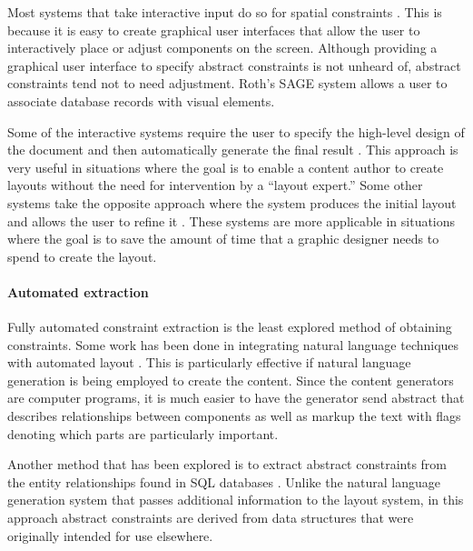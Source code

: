       Most systems that take interactive input do so for spatial constraints
      \citep{singh-2,hudson-2,borning-1}. This is because it is easy to create
      graphical user interfaces that allow the user to interactively place or
      adjust components on the screen. Although providing a graphical user
      interface to specify abstract constraints is not unheard of, abstract
      constraints tend not to need adjustment. Roth’s SAGE system \citep{roth-1}
      allows a user to associate database records with visual elements.

      Some of the interactive systems require the user to specify the high-level
      design of the document and then automatically generate the final result
      \citep{kim-1}. This approach is very useful in situations where the goal is
      to enable a content author to create layouts without the need for
      intervention by a “layout expert.” Some other systems take the opposite
      approach where the system produces the initial layout and allows the user
      to refine it \citep{singh-1}. These systems are more applicable in
      situations where the goal is to save the amount of time that a graphic
      designer needs to spend to create the layout.

     \paragraph{Automated extraction}

      Fully automated constraint extraction is the least explored method of
      obtaining constraints. Some work has been done in integrating natural
      language techniques with automated layout \citep{roth-2}. This is
      particularly effective if natural language generation is being employed to
      create the content. Since the content generators are computer programs, it
      is much easier to have the generator send abstract that describes
      relationships between components as well as markup the text with flags
      denoting which parts are particularly important.

      Another method that has been explored is to extract abstract constraints
      from the entity relationships found in SQL databases \citep{pizano-1}.
      Unlike the natural language generation system that passes additional
      information to the layout system, in this approach abstract constraints are
      derived from data structures that were originally intended for use
      elsewhere.

